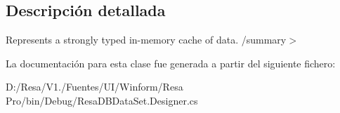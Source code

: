 \subsection{Descripción detallada}
Represents a strongly typed in-\/memory cache of data. /summary$>$ 

La documentación para esta clase fue generada a partir del siguiente fichero\+:\begin{DoxyCompactItemize}
\item 
D\+:/\+Resa/\+V1./\+Fuentes/\+U\+I/\+Winform/\+Resa Pro/bin/\+Debug/Resa\+D\+B\+Data\+Set.\+Designer.\+cs\end{DoxyCompactItemize}
